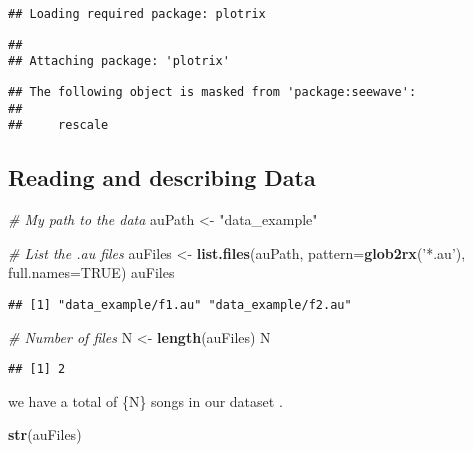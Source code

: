 \documentclass[]{article}
\newenvironment{Shaded}{\begin{snugshade}}{\end{snugshade}}
\newcommand{\KeywordTok}[1]{\textcolor[rgb]{0.13,0.29,0.53}{\textbf{#1}}}
\newcommand{\DataTypeTok}[1]{\textcolor[rgb]{0.13,0.29,0.53}{#1}}
\newcommand{\StringTok}[1]{\textcolor[rgb]{0.31,0.60,0.02}{#1}}
\newcommand{\CommentTok}[1]{\textcolor[rgb]{0.56,0.35,0.01}{\textit{#1}}}
\newcommand{\OtherTok}[1]{\textcolor[rgb]{0.56,0.35,0.01}{#1}}
\newcommand{\NormalTok}[1]{#1}
\begin{document}
\begin{verbatim}
## Loading required package: plotrix
\end{verbatim}

\begin{verbatim}
## 
## Attaching package: 'plotrix'
\end{verbatim}

\begin{verbatim}
## The following object is masked from 'package:seewave':
## 
##     rescale
\end{verbatim}

\subsection{Reading and describing
Data}\label{reading-and-describing-data}

\begin{Shaded}
\begin{Highlighting}[]
\CommentTok{# My path to the data }
\NormalTok{auPath <-}\StringTok{ "data_example"}

\CommentTok{# List the .au files}
\NormalTok{auFiles <-}\StringTok{ }\KeywordTok{list.files}\NormalTok{(auPath, }\DataTypeTok{pattern=}\KeywordTok{glob2rx}\NormalTok{(}\StringTok{'*.au'}\NormalTok{), }\DataTypeTok{full.names=}\OtherTok{TRUE}\NormalTok{)}
\NormalTok{auFiles}
\end{Highlighting}
\end{Shaded}

\begin{verbatim}
## [1] "data_example/f1.au" "data_example/f2.au"
\end{verbatim}

\begin{Shaded}
\begin{Highlighting}[]
\CommentTok{# Number of files }
\NormalTok{N <-}\StringTok{ }\KeywordTok{length}\NormalTok{(auFiles)}
\NormalTok{N}
\end{Highlighting}
\end{Shaded}

\begin{verbatim}
## [1] 2
\end{verbatim}

we have a total of \{N\} songs in our dataset .

\begin{Shaded}
\begin{Highlighting}[]
\KeywordTok{str}\NormalTok{(auFiles)}
\end{Highlighting}
\end{Shaded}
\end{document}
